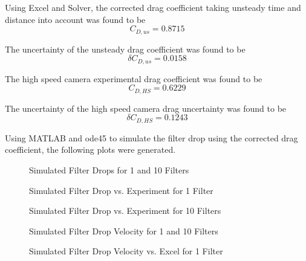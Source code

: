 \documentclass[12pt]{report}
\begin{document}
\noindent Using Excel and Solver, the corrected drag coefficient taking unsteady time and distance into account was found to be
\begin{equation*}
	C_{D,us} = 0.8715
\end{equation*}	

\noindent The uncertainty of the unsteady drag coefficient was found to be
\begin{equation*}
	\delta C_{D,us} = 0.0158
\end{equation*}

\noindent The high speed camera experimental drag coefficient was found to be
\begin{equation*}
	C_{D,HS} = 0.6229
\end{equation*}

\noindent The uncertainty of the high speed camera drag uncertainty was found to be
\begin{equation*}
	\delta C_{D,HS} = 0.1243
\end{equation*}

\noindent Using MATLAB and ode45 to simulate the filter drop using the corrected drag coefficient, the following plots were generated.

\begin{figure}
	\centering
	\caption{Simulated Filter Drops for 1 and 10 Filters}
	\label{fig:filterdropsim}
\end{figure}

\begin{figure}
	\centering
	\caption{Simulated Filter Drop vs. Experiment for 1 Filter}
	\label{fig:filterdropsim1}
\end{figure}

\begin{figure}
	\centering
	\caption{Simulated Filter Drop vs. Experiment for 10 Filters}
	\label{fig:filterdropsim10}
\end{figure}

\begin{figure}
	\centering
	\caption{Simulated Filter Drop Velocity for 1 and 10 Filters}
	\label{fig:filterdropsimvel}
\end{figure}

\begin{figure}
	\centering
	\caption{Simulated Filter Drop Velocity vs. Excel for 1 Filter}
	\label{fig:filterdropsimvel1}
\end{figure}
\end{document}
